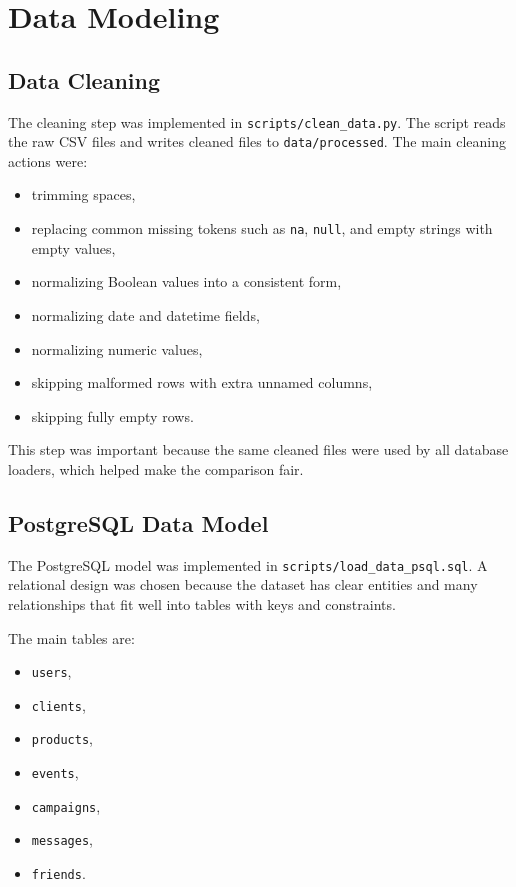 \documentclass[11pt,a4paper]{article}
\begin{document}
\section{Data Modeling}
\subsection{Data Cleaning}
The cleaning step was implemented in \texttt{scripts/clean\_data.py}. The script reads the raw CSV files and writes cleaned files to \texttt{data/processed}. The main cleaning actions were:
\begin{itemize}
    \item trimming spaces,
    \item replacing common missing tokens such as \texttt{na}, \texttt{null}, and empty strings with empty values,
    \item normalizing Boolean values into a consistent form,
    \item normalizing date and datetime fields,
    \item normalizing numeric values,
    \item skipping malformed rows with extra unnamed columns,
    \item skipping fully empty rows.
\end{itemize}

This step was important because the same cleaned files were used by all database loaders, which helped make the comparison fair.

\subsection{PostgreSQL Data Model}
The PostgreSQL model was implemented in \texttt{scripts/load\_data\_psql.sql}. A relational design was chosen because the dataset has clear entities and many relationships that fit well into tables with keys and constraints.

The main tables are:
\begin{itemize}
    \item \texttt{users},
    \item \texttt{clients},
    \item \texttt{products},
    \item \texttt{events},
    \item \texttt{campaigns},
    \item \texttt{messages},
    \item \texttt{friends}.
\end{itemize}
\end{document}
